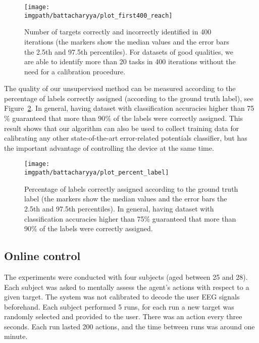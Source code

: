 \begin{figure}[!ht]
    \centering
    \texttt{[image: \\imgpath/battacharyya/plot\_first400\_reach]} 
    \caption{Number of targets correctly and incorrectly identified in 400 iterations (the markers show the median values and the error bars the 2.5th and 97.5th percentiles). For datasets of good qualities, we are able to identify more than 20 tasks in 400 iterations without the need for a calibration procedure.}
    \label{fig:overlapavg_sum_400}
\end{figure} 

The quality of our unsupervised method can be measured according to the percentage of labels correctly assigned (according to the ground truth label), see Figure~\ref{fig:overlappercentageLabels}. In general, having dataset with classification accuracies higher than 75$\%$ guaranteed that more than 90$\%$ of the labels were correctly assigned. This result shows that our algorithm can also be used to collect training data for calibrating any other state-of-the-art error-related potentials classifier, but has the important advantage of controlling the device at the same time.

\begin{figure}[!ht]
    \centering
        \texttt{[image: \\imgpath/battacharyya/plot\_percent\_label]}
        \caption{Percentage of labels correctly assigned according to the ground truth label (the markers show the median values and the error bars the 2.5th and 97.5th percentiles). In general, having dataset with classification accuracies higher than 75$\%$ guaranteed that more than 90$\%$ of the labels were correctly assigned.}
        \label{fig:overlappercentageLabels}
\end{figure}

\subsection{Online control}

The experiments were conducted with four subjects (aged between 25 and 28). Each subject was asked to mentally assess the agent's actions with respect to a given target. The system was not calibrated to decode the user EEG signals beforehand. Each subject performed 5 runs, for each run a new target was randomly selected and provided to the user. There was an action every three seconds. Each run lasted 200 actions, and the time between runs was around one minute.

